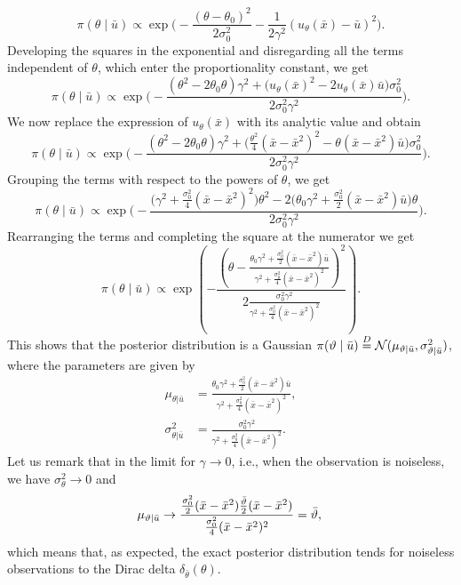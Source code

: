 \documentclass[10pt]{article}
\begin{document}
\begin{equation}
	\pi(\theta \mid \bar u) \propto \exp\Big(-\frac{(\theta - \theta_0)^2}{2\sigma_0^2} - \frac{1}{2\gamma^2}(u_\theta(\bar x) - \bar u )^2 \Big).
\end{equation}
Developing the squares in the exponential and disregarding all the terms independent of $\theta$, which enter the proportionality constant, we get
\begin{equation}
	\pi(\theta \mid \bar u) \propto \exp\Big(-\frac{(\theta^2 - 2\theta_0\theta)\gamma^2 + \big(u_\theta(\bar x)^2 - 2u_\theta(\bar x)\bar u\big)\sigma_0^2 }{2\sigma_0^2\gamma^2}\Big).
\end{equation}
We now replace the expression of $u_\theta(\bar x)$ with its analytic value and obtain
\begin{equation}
	\pi(\theta \mid \bar u) \propto \exp\Bigg(-\frac{(\theta^2 - 2\theta_0\theta)\gamma^2 + \big(\frac{\theta^2}{4}(\bar x - \bar x^2)^2 - \theta(\bar x - \bar x^2)\bar u\big)\sigma_0^2 }{2\sigma_0^2\gamma^2}\Bigg).
\end{equation}
Grouping the terms with respect to the powers of $\theta$, we get
\begin{equation}
	\pi(\theta \mid \bar u) \propto \exp\Bigg(-\frac{\big(\gamma^2 + \frac{\sigma_0^2}{4}(\bar x - \bar x^2)^2\big)\theta^2 - 2\big(\theta_0 \gamma^2 + \frac{\sigma_0^2}{2}(\bar x - \bar x^2)\bar u\big)\theta}{2\sigma_0^2\gamma^2}\Bigg).
\end{equation}
Rearranging the terms and completing the square at the numerator we get
\begin{equation}
	\pi(\theta \mid \bar u) \propto \exp\left(-\frac{\left(\theta - \frac{\theta_0 \gamma^2 + \frac{\sigma_0^2}{2}(\bar x - \bar x^2)\bar u}{\gamma^2 + \frac{\sigma_0^2}{4}(\bar x - \bar x^2)^2}\right)^2}{2\frac{\sigma_0^2\gamma^2}{\gamma^2 + \frac{\sigma_0^2}{4}(\bar x - \bar x^2)^2}}\right).
\end{equation}
This shows that the posterior distribution is a Gaussian $\pi(\theta \mid \bar u) \eqtext{D} \mathcal{N}(\mu_{\theta|\bar u}, \sigma^2_{\theta|\bar u})$, where the parameters are given by
\begin{equation}
\begin{aligned}
	\mu_{\theta|\bar u} &= \frac{\theta_0 \gamma^2 + \frac{\sigma_0^2}{2}(\bar x - \bar x^2)\bar u}{\gamma^2 + \frac{\sigma_0^2}{4}(\bar x - \bar x^2)^2}, \\
	\sigma^2_{\theta|\bar u} &= \frac{\sigma_0^2\gamma^2}{\gamma^2 + \frac{\sigma_0^2}{4}(\bar x - \bar x^2)^2}.
\end{aligned}
\end{equation}
Let us remark that in the limit for $\gamma \to 0$, i.e., when the observation is noiseless, we have $\sigma^2_\theta \to 0$ and 
\begin{equation}
	\mu_{\theta|\bar u} \to \frac{\frac{\sigma_0^2}{2}(\bar x - \bar x^2)\frac{\bar \theta}{2}(\bar x - \bar x^2)}{\frac{\sigma_0^2}{4}(\bar x - \bar x^2)^2} = \bar \theta, \\
\end{equation}
which means that, as expected, the exact posterior distribution tends for noiseless observations to the Dirac delta $\delta_{\bar \theta}(\theta)$.
\end{document}
